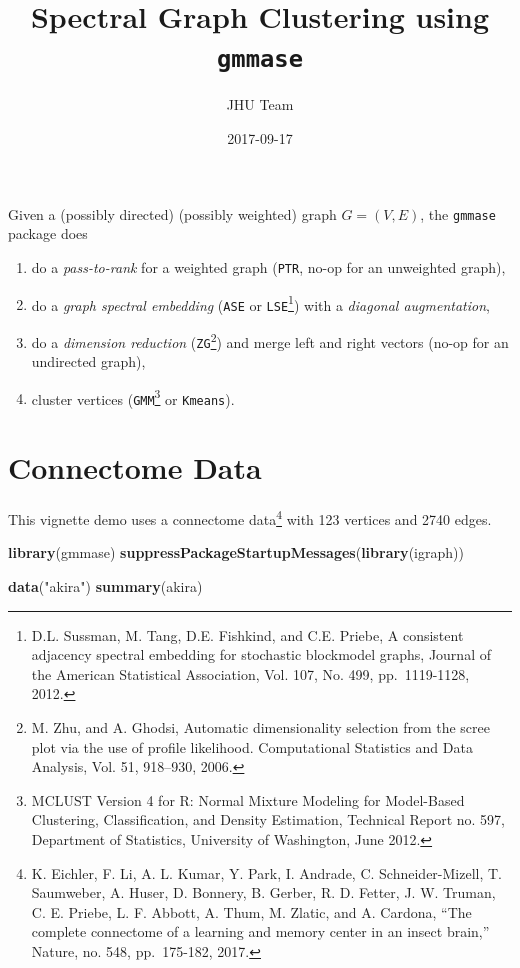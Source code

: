\documentclass[]{article}
\title{Spectral Graph Clustering using \texttt{gmmase}}
\author{JHU Team}
\date{2017-09-17}
\newenvironment{Shaded}{\begin{snugshade}}{\end{snugshade}}
\newcommand{\KeywordTok}[1]{\textcolor[rgb]{0.13,0.29,0.53}{\textbf{#1}}}
\newcommand{\StringTok}[1]{\textcolor[rgb]{0.31,0.60,0.02}{#1}}
\newcommand{\NormalTok}[1]{#1}
\providecommand{\tightlist}{%
  \setlength{\itemsep}{0pt}\setlength{\parskip}{0pt}}
\let\rmarkdownfootnote\footnote%
\def\footnote{\protect\rmarkdownfootnote}
\begin{document}
\maketitle

{
\setcounter{tocdepth}{2}
\tableofcontents
}
Given a (possibly directed) (possibly weighted) graph \(G=(V,E)\), the
\texttt{gmmase} package does

\begin{enumerate}
\def\labelenumi{\arabic{enumi}.}
\tightlist
\item
  do a \emph{pass-to-rank} for a weighted graph (\texttt{PTR}, no-op for
  an unweighted graph),
\item
  do a \emph{graph spectral embedding} (\texttt{ASE} or
  \texttt{LSE}\footnote{D.L. Sussman, M. Tang, D.E. Fishkind, and C.E.
    Priebe, A consistent adjacency spectral embedding for stochastic
    blockmodel graphs, Journal of the American Statistical Association,
    Vol. 107, No. 499, pp.~1119-1128, 2012.}) with a \emph{diagonal
  augmentation},
\item
  do a \emph{dimension reduction} (\texttt{ZG}\footnote{M. Zhu, and A.
    Ghodsi, Automatic dimensionality selection from the scree plot via
    the use of profile likelihood. Computational Statistics and Data
    Analysis, Vol. 51, 918--930, 2006.}) and merge left and right
  vectors (no-op for an undirected graph),
\item
  cluster vertices (\texttt{GMM}\footnote{MCLUST Version 4 for R: Normal
    Mixture Modeling for Model-Based Clustering, Classification, and
    Density Estimation, Technical Report no. 597, Department of
    Statistics, University of Washington, June 2012.} or
  \texttt{Kmeans}).
\end{enumerate}

\section{Connectome Data}\label{connectome-data}

This vignette demo uses a connectome data\footnote{K. Eichler, F. Li, A.
  L. Kumar, Y. Park, I. Andrade, C. Schneider-Mizell, T. Saumweber, A.
  Huser, D. Bonnery, B. Gerber, R. D. Fetter, J. W. Truman, C. E.
  Priebe, L. F. Abbott, A. Thum, M. Zlatic, and A. Cardona, ``The
  complete connectome of a learning and memory center in an insect
  brain,'' Nature, no. 548, pp.~175-182, 2017.} with 123 vertices and
2740 edges.

\begin{Shaded}
\begin{Highlighting}[]
\KeywordTok{library}\NormalTok{(gmmase)}
\KeywordTok{suppressPackageStartupMessages}\NormalTok{(}\KeywordTok{library}\NormalTok{(igraph))}

\KeywordTok{data}\NormalTok{(}\StringTok{"akira"}\NormalTok{)}
\KeywordTok{summary}\NormalTok{(akira)}
\end{Highlighting}
\end{Shaded}
\end{document}
